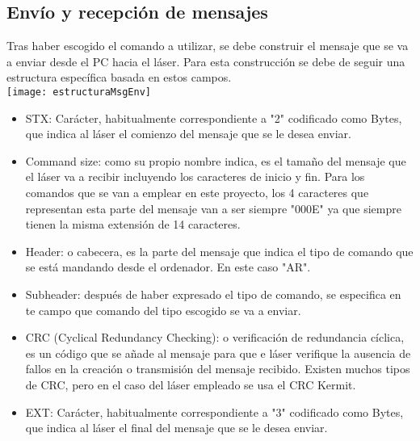  \subsection{Envío y recepción de mensajes}
 Tras haber escogido el comando a utilizar, se debe construir el mensaje que se va a enviar desde el PC hacia el láser. Para esta construcción se debe de seguir una estructura específica basada en estos campos.\\
 \texttt{[image: estructuraMsgEnv]}
 \begin{itemize}
 	\item STX: Carácter, habitualmente correspondiente a "2" codificado como Bytes, que indica al láser el comienzo del mensaje que se le desea enviar.
 	\item Command size: como su propio nombre indica, es el tamaño del mensaje que el láser va a recibir incluyendo los caracteres de inicio y fin. Para los comandos que se van a emplear en este proyecto, los 4 caracteres que representan esta parte del mensaje van a ser siempre "000E" ya que siempre tienen la misma extensión de 14 caracteres.
 	\item Header: o cabecera, es la parte del mensaje que indica el tipo de comando que se está mandando desde el ordenador. En este caso "AR".
 	\item Subheader: después de haber expresado el tipo de comando, se especifica en te campo que comando del tipo escogido se va a enviar.
 	\item CRC (Cyclical Redundancy Checking):  o verificación de redundancia cíclica, es un código que se añade al mensaje para que e láser verifique la ausencia de fallos en la creación o transmisión del mensaje recibido. Existen muchos tipos de CRC, pero en el caso del láser empleado se usa el CRC Kermit.
 	\item EXT: Carácter, habitualmente correspondiente a "3" codificado como Bytes, que indica al láser el final del mensaje que se le desea enviar.
 \end{itemize}
 
